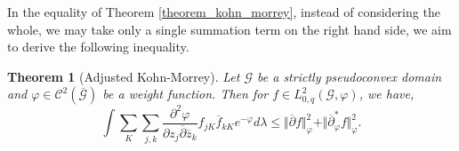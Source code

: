 \documentclass{article}
\newtheorem{theorem}{Theorem} [section]
\newcommand{\norm}[1]{\Vert #1 \Vert}
\newcommand{\G}[0]{\mathcal{G}}
\newcommand{\cbd}[0]{\overline{\partial}}
\begin{document}
    In the equality of Theorem \ref{theorem_kohn_morrey}, instead of considering the whole, we may take only a single summation term on the right hand side, we aim to derive the following inequality.

    \begin{theorem}[Adjusted Kohn-Morrey]
      Let $\G$ be a strictly pseudoconvex domain and $\varphi\in\mathcal{C}^2(\overline{\G})$ be a weight function. Then for $f\in L^2_{0,q}(\G,\varphi)$, we have,
      \begin{equation*}
        \int\sum_K\sum_{j,k}{\frac {\partial^2\varphi}{\partial z_j\overline{\partial}\overline{z}_k}}f_{jK}\overline{f}_{kK}e^{-\varphi}d\lambda\leq\norm{\cbd f}_\varphi^2+\norm{\cbd_\varphi^*f}^2_{\varphi}.
      \end{equation*}
    \end{theorem}
\end{document}
